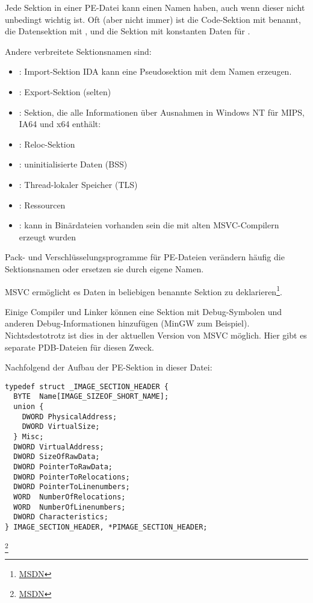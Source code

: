Jede Sektion in einer PE-Datei kann einen Namen haben, auch wenn dieser nicht
unbedingt wichtig ist.
Oft (aber nicht immer) ist die Code-Sektion mit  benannt, die Datensektion
mit , und die Sektion mit konstanten Daten  für .

Andere verbreitete Sektionsnamen sind:

\begin{itemize}
\item {}: Import-Sektion
\ac{IDA} kann eine Pseudosektion mit dem Namen  erzeugen.
\item {}: Export-Sektion (selten)
\item {}: Sektion, die alle Informationen über Ausnahmen in Windows NT
für MIPS, \ac{IA64} und x64 enthält: 
\item {}: Reloc-Sektion
\item {}: uninitialisierte Daten (\ac{BSS})
\item {}: Thread-lokaler Speicher (\ac{TLS})
\item {}: Ressourcen
\item {}: kann in Binärdateien vorhanden sein die mit alten MSVC-Compilern
erzeugt wurden
\end{itemize}

Pack- und Verschlüsselungsprogramme für PE-Dateien verändern häufig die Sektionsnamen
oder ersetzen sie durch eigene Namen.

\ac{MSVC} ermöglicht es Daten in beliebigen benannte Sektion zu
deklarieren\footnote{\href{http://go.yurichev.com/17047}{MSDN}}.

Einige Compiler und Linker können eine Sektion mit Debug-Symbolen und anderen
Debug-Informationen hinzufügen (MinGW zum Beispiel).
Nichtsdestotrotz ist dies in der aktuellen Version von \ac{MSVC} möglich.
Hier gibt es separate \gls{PDB}-Dateien für diesen Zweck.

Nachfolgend der Aufbau der PE-Sektion in dieser Datei:

\begin{lstlisting}
typedef struct _IMAGE_SECTION_HEADER {
  BYTE  Name[IMAGE_SIZEOF_SHORT_NAME];
  union {
    DWORD PhysicalAddress;
    DWORD VirtualSize;
  } Misc;
  DWORD VirtualAddress;
  DWORD SizeOfRawData;
  DWORD PointerToRawData;
  DWORD PointerToRelocations;
  DWORD PointerToLinenumbers;
  WORD  NumberOfRelocations;
  WORD  NumberOfLinenumbers;
  DWORD Characteristics;
} IMAGE_SECTION_HEADER, *PIMAGE_SECTION_HEADER;
\end{lstlisting}
\footnote{\href{http://go.yurichev.com/17048}{MSDN}}

